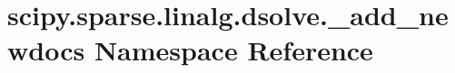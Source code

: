 \hypertarget{namespacescipy_1_1sparse_1_1linalg_1_1dsolve_1_1__add__newdocs}{}\section{scipy.\+sparse.\+linalg.\+dsolve.\+\_\+add\+\_\+newdocs Namespace Reference}
\label{namespacescipy_1_1sparse_1_1linalg_1_1dsolve_1_1__add__newdocs}
